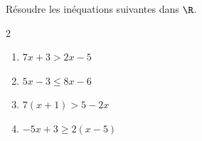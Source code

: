 \begin{exo}{}
	Résoudre les inéquations suivantes dans $\R$.
	\vspace*{-2mm}\begin{multicols}{2}
	\begin{enumerate}[itemsep=2mm]
		\item $7x + 3 > 2x - 5$
		\item $5x - 3 \le 8x - 6$
		\item $7(x + 1) > 5 - 2x$
		\item $-5x + 3 \ge 2(x - 5)$
	\end{enumerate}
	\end{multicols}\vspace*{-2mm}
\end{exo}
